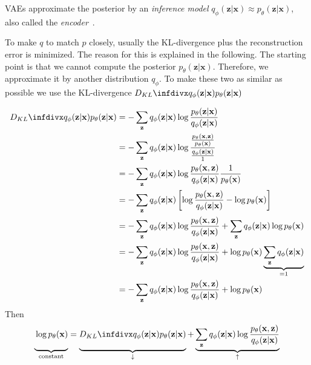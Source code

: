 \acp{VAE} approximate the posterior by an \textit{inference model} $q_\phi(\mathbf{z}|\mathbf{x}) \approx p_\theta(\mathbf{z}|\mathbf{x})$, also called the \textit{encoder}~\citep[p. 15]{kingma2019introduction}.

To make $q$ to match $p$ closely, usually the \ac{KL-divergence} plus the reconstruction error is minimized.
The reason for this is explained in the following.
The starting point is that we cannot compute the posterior $p_\theta(\mathbf{z}|\mathbf{x})$.
Therefore, we approximate it by another distribution $q_\phi$.
To make these two as similar as possible we use the \ac{KL-divergence} $\kldiv{q_\phi(\mathbf{z}|\mathbf{x})}{p_\theta(\mathbf{z}|\mathbf{x})}$

\begin{align}
    \kldiv{q_\phi(\mathbf{z}|\mathbf{x})}{p_\theta(\mathbf{z}|\mathbf{x})} &= -\sum_\mathbf{z} q_\phi(\mathbf{z}|\mathbf{x}) \log \frac{p_\theta(\mathbf{z}|\mathbf{x})}{q_\phi(\mathbf{z}|\mathbf{x})} \\
    &= -\sum_\mathbf{z} q_\phi(\mathbf{z}|\mathbf{x}) \log \frac{\frac{p_\theta(\mathbf{x},\mathbf{z})}{p_\theta(\mathbf{x})}}{\frac{q_\phi(\mathbf{z}|\mathbf{x})}{1}}\\
    &= -\sum_\mathbf{z} q_\phi(\mathbf{z}|\mathbf{x}) \log \frac{p_\theta(\mathbf{x},\mathbf{z})}{q_\phi(\mathbf{z}|\mathbf{x})}\frac{1}{p_\theta(\mathbf{x})}\\
    &= -\sum_\mathbf{z} q_\phi(\mathbf{z}|\mathbf{x}) \left[ \log \frac{p_\theta(\mathbf{x},\mathbf{z})}{q_\phi(\mathbf{z}|\mathbf{x})} - \log p_\theta(\mathbf{x}) \right]\\
    &= -\sum_\mathbf{z} q_\phi(\mathbf{z}|\mathbf{x}) \log \frac{p_\theta(\mathbf{x},\mathbf{z})}{q_\phi(\mathbf{z}|\mathbf{x})} + \sum_\mathbf{z} q_\phi(\mathbf{z}|\mathbf{x}) \log p_\theta(\mathbf{x}) \\
    &= -\sum_\mathbf{z} q_\phi(\mathbf{z}|\mathbf{x}) \log \frac{p_\theta(\mathbf{x},\mathbf{z})}{q_\phi(\mathbf{z}|\mathbf{x})} + \log p_\theta(\mathbf{x}) \underbrace{\sum_\mathbf{z} q_\phi(\mathbf{z}|\mathbf{x})}_{=1} \\
    &= -\sum_\mathbf{z} q_\phi(\mathbf{z}|\mathbf{x}) \log \frac{p_\theta(\mathbf{x},\mathbf{z})}{q_\phi(\mathbf{z}|\mathbf{x})} + \log p_\theta(\mathbf{x})
\end{align}
Then
\begin{align}
    \underbrace{\vphantom{\sum_\mathbf{z} x}\log p_\theta(\mathbf{x})}_{\text{constant}} =  \underbrace{\vphantom{\sum_\mathbf{z} x}\kldiv{q_\phi(\mathbf{z}|\mathbf{x})}{p_\theta(\mathbf{z}|\mathbf{x})}}_{\downarrow}  + \underbrace{\sum_\mathbf{z} q_\phi(\mathbf{z}|\mathbf{x}) \log \frac{p_\theta(\mathbf{x},\mathbf{z})}{q_\phi(\mathbf{z}|\mathbf{x})}}_{\uparrow}
\end{align}
